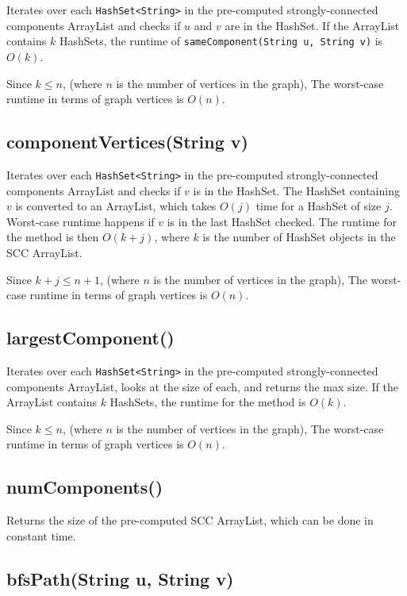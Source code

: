 \documentclass[12pt]{article}
\begin{document}
Iterates over each \lstinline|HashSet<String>| in the pre-computed
strongly-connected components ArrayList and checks if
$u$ and $v$ are in the HashSet. If the ArrayList contains
$k$ HashSets, the runtime of
\lstinline|sameComponent(String u, String v)| is $O(k)$.

\bigskip
\noindent
Since $k \leq n$, (where $n$ is the number of vertices in the graph),
The worst-case runtime in terms of graph vertices is $O(n)$.

\subsection{componentVertices(String v)}

Iterates over each \lstinline|HashSet<String>| in the pre-computed
strongly-connected components ArrayList and checks if
$v$ is in the HashSet. The HashSet containing $v$ is converted to
an ArrayList, which takes $O(j)$ time for a HashSet of size $j$.
Worst-case runtime happens if $v$ is in the last HashSet checked.
The runtime for the method is then $O(k + j)$, where $k$ is the
number of HashSet objects in the SCC ArrayList.

\bigskip
\noindent
Since $k + j \leq n + 1$, (where $n$ is the number of vertices
in the graph), The worst-case runtime in terms of graph vertices
is $O(n)$.

\subsection{largestComponent()}

Iterates over each \lstinline|HashSet<String>| in the pre-computed
strongly-connected components ArrayList, looks at the size of
each, and returns the max size. If the ArrayList contains
$k$ HashSets, the runtime for the method is $O(k)$.

\bigskip
\noindent
Since $k \leq n$, (where $n$ is the number of vertices in the graph),
The worst-case runtime in terms of graph vertices is $O(n)$.

\subsection{numComponents()}

Returns the size of the pre-computed SCC ArrayList, which can be
done in constant time.

\subsection{bfsPath(String u, String v)}
\end{document}
